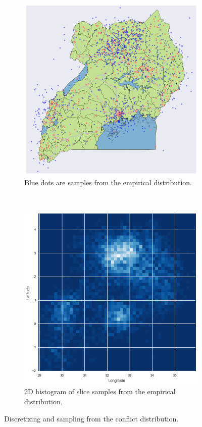 \documentclass[a0,final]{a0poster}
\begin{document}
\begin{multicols}{3}
\begin{figure}[H]
  \centering
  \begin{subfigure}[b]{0.5\columnwidth}
    \centering
    \includegraphics[width=\textwidth]{../write-up/figures/1000-slice-samples}
    \caption{Blue dots are samples from the empirical distribution.}
    \label{fig:sampled-conflicts}
  \end{subfigure}~\begin{subfigure}[b]{0.5\columnwidth}
    \centering
    \includegraphics[width=\textwidth]{../write-up/figures/histogram}
    \caption{2D histogram of slice samples from the empirical distribution.}
    \label{fig:histogram}
  \end{subfigure}
  \caption{Discretizing and sampling from the conflict distribution.}
\end{figure}


\end{multicols}
\end{document}
